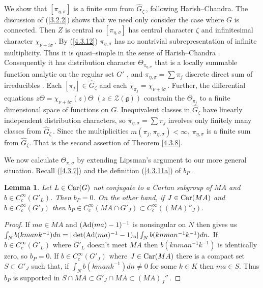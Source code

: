 \documentclass{conm-p-l}
\newtheorem{lemma}[equation]{Lemma}
\renewcommand{\gg}{\mathfrak{g}}
\def\gg{\mathfrak{g}}
\def\gn{\mathfrak{n}}
\def\Ad{{\rm Ad}}
\def\Car{{\rm Car}}
\def\cZ{\mathcal{Z}}
\begin{document}
We show that $[\pi_{\eta,\sigma}]$ is a finite sum from $\widehat{G}_\zeta$\,,
following Harish--Chandra.  The discussion of (\ref{3.2.2}) shows that we
need only consider the case where $G$ is connected.  Then $Z$ is central so
$[\pi_{\eta,\sigma}]$ has central character $\zeta$ and infinitesimal character
$\chi_{\nu + i \sigma}$\,.  By (\ref{4.3.12}) $\pi_{\eta,\sigma}$ has no
nontrivial subrepresentation of infinite multiplicity.  Thus it is 
quasi--simple in the sense of Harish--Chandra \cite[p. 145]{HC1956c}.
Consequently it has distribution character $\Theta_{\pi_{\eta,\sigma}}$ that
is a locally summable function analytic on the regular set $G'$ 
\cite[Theorem 6]{HC1956c}, and $\pi_{\eta,\sigma} = \sum \pi_j$ discrete 
direct sum of irreducibles \cite[Lemma 2]{HC1954c}.  Each $[\pi_j] \in 
\widehat{G}_\zeta$ and each $\chi_{\pi_j} = \chi_{\nu + i\sigma}$\,.  Further,
the differential equations $z\Theta = \chi_{\nu + i\sigma}(z)\Theta$ 
$(z \in \cZ(\gg))$ constrain
the $\Theta_{\pi_j}$ to a finite dimensional space of functions on $G$.
Inequivalent classes in $\widehat{G}_\zeta$ have linearly independent 
distribution characters, so $\pi_{\eta,\sigma} = \sum \pi_j$ involves only
finitely many classes from $\widehat{G}_\zeta$\,.  Since the multiplicities 
$m(\pi_j,\pi_{\eta,\sigma}) < \infty$, $\pi_{\eta,\sigma}$ is a finite sum
from $\widehat{G}_\zeta$.  That is the second assertion of Theorem \ref{4.3.8}.

We now calculate $\Theta_{\pi,\sigma}$ by extending Lipsman's argument
\cite[Theorem 9.1]{L1971} to our more general situation.  Recall (\ref{4.3.7})
and the definition (\ref{4.3.11a}) of $b_P$\,.
\begin{lemma}\label{4.3.13}
Let $L \in \Car(G)$ not conjugate to a Cartan subgroup of $MA$ and
$b \in C^\infty_c(G'_L)$.  Then $b_P = 0$.  On the other hand, 
if $J \in \Car(MA)$ and
$b \in C^\infty_c(G'_J)$ then $b_P \in C^\infty_c(MA\cap G'_J)
\subset C^\infty_c((MA)''_J)$.
\end{lemma}
\begin{proof}
If $ma \in MA$ and $(\Ad(ma)-1)^{-1}$ is nonsingular on $N$ then
\cite[Lemma 11]{HC1966a} gives us 
$
\int_N b(kmank^{-1})dn=|\det(\Ad(ma)^{-1} - 1)_\gn|\int_N b(knman^{-1}k^{-1})dn.
$
If $b \in C^\infty_c(G'_L)$ where $G'_L$ doesn't meet $MA$ then 
$b(knman^{-1}k^{-1})$ is identically zero, so $b_P = 0$.  If
$b \in C^\infty_c(G'_J)$ where $J \in \Car(MA)$ there is a compact set
$S \subset G'_J$ such that, if $\int_N b(kmank^{-1})dn \ne 0$ for some
$k \in K$ then $ma \in S$.  Thus $b_P$ is supported in
$S \cap MA \subset G'_J\cap MA \subset (MA)_J''$\,.
\end{proof}
\end{document}
